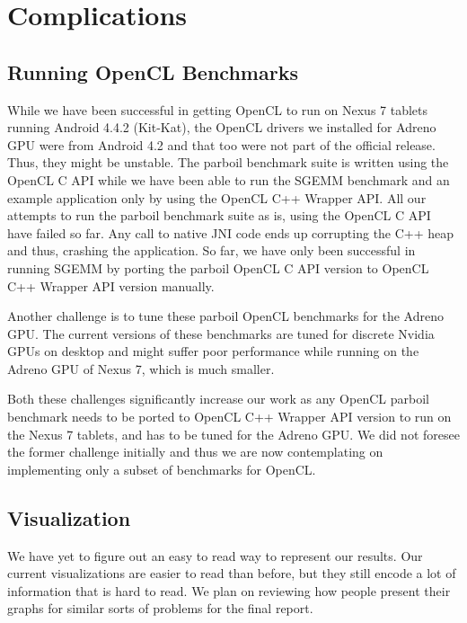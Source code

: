 \section*{Complications}
\subsection*{Running OpenCL Benchmarks}


While we have been successful in getting OpenCL to run on Nexus 7 tablets
running Android 4.4.2 (Kit-Kat), the OpenCL drivers we installed for Adreno
GPU were from
Android 4.2 and that too were not part of the official release. Thus, they might
be unstable. The parboil benchmark suite is written using the OpenCL C API while
we have been able to run the SGEMM benchmark and an example application only by using
the OpenCL C++ Wrapper API. All our attempts to run the parboil benchmark suite as
is, using the OpenCL C API have failed so far. Any call to native JNI code
ends up corrupting the C++ heap and thus, crashing the application. So far, we
have only been successful in running SGEMM by porting the parboil OpenCL C
API version to OpenCL C++ Wrapper API version manually.

Another challenge is to tune these parboil OpenCL benchmarks for the Adreno GPU.
The current versions of these benchmarks are tuned for discrete Nvidia GPUs on desktop and might
suffer poor performance while running on the Adreno GPU of Nexus 7, which is much
smaller.

Both these challenges significantly
increase our work as any OpenCL parboil benchmark needs to be ported to OpenCL
C++ Wrapper API version to run on the Nexus 7 tablets, and has to be tuned for
the Adreno GPU. We did not foresee the former
challenge initially and thus we are now contemplating on implementing only a
subset of benchmarks for OpenCL.

\subsection*{Visualization}

We have yet to figure out an easy to read way to represent our results.
Our current visualizations are easier to read than before, but they
  still encode a lot of information that is hard to read.
We plan on reviewing how people present their graphs for similar sorts
  of problems for the final report.
